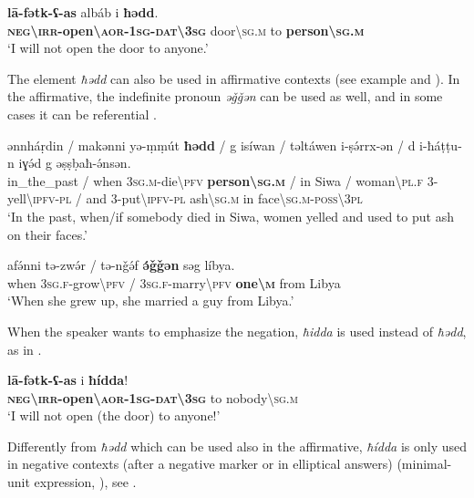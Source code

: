 \documentclass[output=paper,colorlinks,citecolor=brown]{langscibook}
\begin{document}
\ea\label{ex:siw:49}
    \gll \textbf{lā-fətk-ʕ-as} albáb i \textbf{ħədd}.  \\
         \textbf{\textsc{neg{\textbackslash}irr}-open{\textbackslash}\textsc{aor}-\textsc{1sg}-\textsc{dat\textbackslash3sg}} door{\textbackslash}\textsc{sg.m} to \textbf{person{\textbackslash}\textsc{sg.m}} \\
    \glt ‘I will not open the door to anyone.’
\z

The element \textit{ħədd} can also be used in affirmative contexts (see example  and ). In the affirmative, the indefinite pronoun \textit{əǧǧən} can be used as well, and in some cases it can be referential .



\ea\label{ex:siw:50}
    \gll ənnh\'{a}ṛdin / makənni yə-ṃṃút \textbf{ħədd} / g isíwan / təltáwen i-ṣə́rrx-ən / d i-ħáṭṭu-n iɣə́d g əṣṣḅaħ-ə́nsən. \\
         in\_the\_past / when \textsc{3sg.m}{}-die{\textbackslash}\textsc{pfv} \textbf{person{\textbackslash}\textsc{sg.m}} / in Siwa / woman{\textbackslash}\textsc{pl.f} \textsc{3-}yell{\textbackslash}\textsc{ipfv-pl} / and 3-put{\textbackslash}\textsc{ipfv-pl} ash{\textbackslash}\textsc{sg.m} in face{\textbackslash}\textsc{sg.m-poss{\textbackslash}3pl}  \\
    \glt ‘In the past, when/if somebody died in Siwa, women yelled and used to put ash on their faces.’
\z

\ea\label{ex:siw:51}
    \gll afə́nni tə-zwə́r / tə-nǧə́f \textbf{ə́ǧǧən} səg líbya.\\
         when \textsc{3sg.f}{}-grow{\textbackslash}\textsc{pfv} / \textsc{3sg.f-}marry{\textbackslash}\textsc{pfv} \textbf{one{\textbackslash}\textsc{m}} from Libya\\
    \glt ‘When she grew up, she married a guy from Libya.’
    \z

When the speaker wants to emphasize the negation, \textit{ħidda} is used instead of \textit{ħədd}, as in .

\ea\label{ex:siw:52}
    \gll \textbf{l\={a}-fətk-ʕ-as} i \textbf{ħídda}!  \\
         \textbf{\textsc{neg{\textbackslash}irr}-open{\textbackslash}\textsc{aor}-\textsc{1sg}-\textsc{dat\textbackslash3sg}} to nobody{\textbackslash}\textsc{sg.m} \\
    \glt ‘I will not open (the door) to anyone!’
\z 

Differently from \textit{ħədd} which can be used also in the affirmative, \textit{ħídda} is only used in negative contexts (after a negative marker or in elliptical answers) (minimal-unit expression, \citealt[227--228]{Haspelmath1997}), see .
\end{document}
